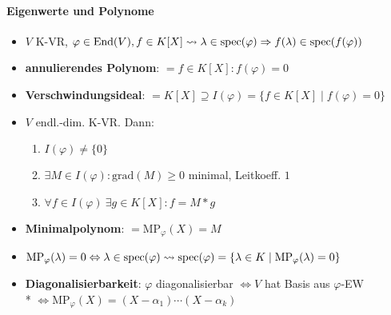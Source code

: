 \paragraph{Eigenwerte und Polynome}
\begin{itemize}
	\item $V$ K-VR, $\varphi \in \text{End}(V), f \in K[X] \\* \leadsto \lambda \in \text{spec}(\varphi) \Rightarrow f(\lambda) \in \text{spec}(f(\varphi))$
	\item \textbf{annulierendes Polynom}: $=f \in K[X]: f(\varphi)=0$
	\item \textbf{Verschwindungsideal}: $=K[X] \supseteq I(\varphi)=\{f \in K[X] \mid f(\varphi)=0 \}$
	\item $V$ endl.-dim. K-VR. Dann:
	\begin{enumerate}
		\item $I(\varphi) \neq \{ 0 \} $
		\item $\exists M \in I(\varphi): \text{grad}(M) \geq 0$ minimal, Leitkoeff. $1$
		\item $\forall f \in I(\varphi) \ \exists g \in K[X]: f=M*g $
	\end{enumerate}
	\item \textbf{Minimalpolynom}: $= \text{MP}_\varphi(X)=M$
	\item $\text{MP}_\varphi(\lambda) = 0 \Leftrightarrow \lambda \in \text{spec}(\varphi) \\* \leadsto \text{spec}(\varphi) = \{ \lambda \in K \mid \text{MP}_\varphi(\lambda) = 0 \}$
	\item \textbf{Diagonalisierbarkeit}: $\varphi$ diagonalisierbar $\Leftrightarrow V$ hat Basis aus $\varphi$-EW \\* $\Leftrightarrow \text{MP}_\varphi(X) = (X-\alpha_1)\cdots(X-\alpha_k)$
\end{itemize}